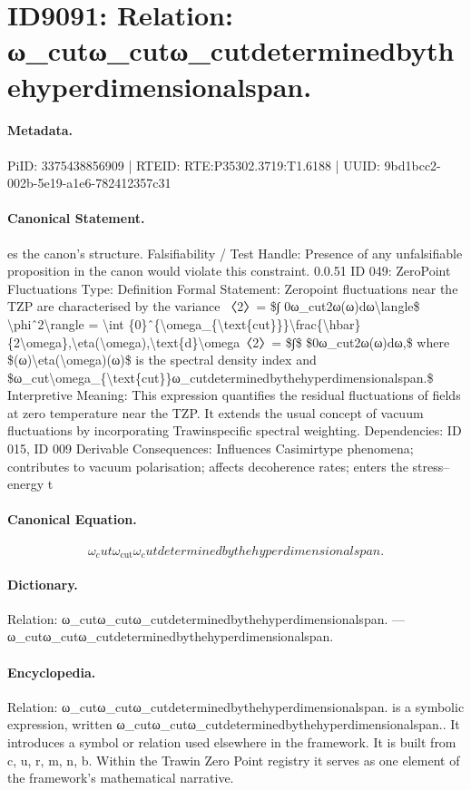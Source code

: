 \section*{ID9091: Relation: ω\_cutω\_cutω\_cutdeterminedbythehyperdimensionalspan.}
\paragraph{Metadata.}
PiID: 3375438856909 | RTEID: RTE:P35302.3719:T1.6188 | UUID: 9bd1bcc2-002b-5e19-a1e6-782412357c31

\paragraph{Canonical Statement.}
es the canon’s structure. Falsifiability / Test Handle: Presence of any unfalsifiable proposition in the canon would violate this constraint. 0.0.51 ID 049: ZeroPoint Fluctuations Type: Definition Formal Statement: Zeropoint fluctuations near the TZP are characterised by the variance 〈2〉= \$∫ 0ω\_cut2ω(ω)dω\textbackslash{}langle\$ \textbackslash{}phiˆ2\textbackslash{}rangle = \textbackslash{}int \{0\}ˆ\{\textbackslash{}omega\_\{\textbackslash{}text\{cut\}\}\}\textbackslash{}frac\{\textbackslash{}hbar\}\{2\textbackslash{}omega\},\textbackslash{}eta(\textbackslash{}omega),\textbackslash{}text\{d\}\textbackslash{}omega〈2〉= \$∫\$ \$0ω\_cut2ω(ω)dω,\$ where \$(ω)\textbackslash{}eta(\textbackslash{}omega)(ω)\$ is the spectral density index and \$ω\_cut\textbackslash{}omega\_\{\textbackslash{}text\{cut\}\}ω\_cutdeterminedbythehyperdimensionalspan.\$ Interpretive Meaning: This expression quantifies the residual fluctuations of fields at zero temperature near the TZP. It extends the usual concept of vacuum fluctuations by incorporating Trawinspecific spectral weighting. Dependencies: ID 015, ID 009 Derivable Consequences: Influences Casimirtype phenomena; contributes to vacuum polarisation; affects decoherence rates; enters the stress–energy t

\paragraph{Canonical Equation.}
\[
ω_cut\omega_{\text{cut}}ω_cutdeterminedbythehyperdimensionalspan.
\]

\paragraph{Dictionary.}
Relation: ω\_cutω\_cutω\_cutdeterminedbythehyperdimensionalspan. — ω\_cutω\_cutω\_cutdeterminedbythehyperdimensionalspan.

\paragraph{Encyclopedia.}
Relation: ω\_cutω\_cutω\_cutdeterminedbythehyperdimensionalspan. is a symbolic expression, written ω\_cutω\_cutω\_cutdeterminedbythehyperdimensionalspan.. It introduces a symbol or relation used elsewhere in the framework. It is built from c, u, r, m, n, b. Within the Trawin Zero Point registry it serves as one element of the framework's mathematical narrative.
